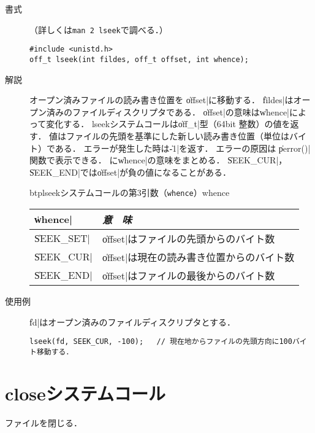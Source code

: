 \begin{description}
\item[書式]（詳しくは\texttt{man 2 lseek}で調べる．）

\begin{lstlisting}[numbers=none]
#include <unistd.h>
off_t lseek(int fildes, off_t offset, int whence);
\end{lstlisting}

\item[解説]
オープン済みファイルの読み書き位置を
\|offset|に移動する．
\|fildes|はオープン済みのファイルディスクリプタである．
\|offset|の意味は\|whence|によって変化する．
lseekシステムコールは\|off_t|型（64bit 整数）の値を返す．
値はファイルの先頭を基準にした新しい読み書き位置（単位はバイト）である．
エラーが発生した時は\|-1|を返す．
エラーの原因は \|perror()| 関数で表示できる．
に\|whence|の意味をまとめる．
\|SEEK_CUR|，\|SEEK_END|では\|offset|が負の値になることがある．

\begin{mytable}{btp}{lseekシステムコールの第3引数（\texttt{whence}）}{whence}
\begin{tabular}{l | l}
\hline\hline
\|whence|    & \emph{意　味} \\\hline
\|SEEK_SET|  &  \|offset|はファイルの先頭からのバイト数  \\
\|SEEK_CUR|  &  \|offset|は現在の読み書き位置からのバイト数  \\
\|SEEK_END|  &  \|offset|はファイルの最後からのバイト数  \\
\end{tabular}
\end{mytable}

\item[使用例]
\|fd|はオープン済みのファイルディスクリプタとする．

\begin{lstlisting}[numbers=none]
lseek(fd, SEEK_CUR, -100);   // 現在地からファイルの先頭方向に100バイト移動する．
\end{lstlisting}
\end{description}

\section{closeシステムコール}

ファイルを閉じる．

